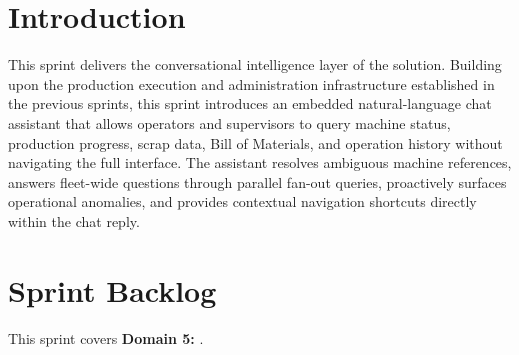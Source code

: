 \section*{Introduction}

This sprint delivers the conversational intelligence layer of the 
solution. Building upon the production execution and administration infrastructure
established in the previous sprints, this sprint introduces an embedded
natural-language chat assistant that allows operators and supervisors to query
machine status, production progress, scrap data, Bill of Materials, and operation
history without navigating the full interface. The assistant resolves ambiguous
machine references, answers fleet-wide questions through parallel fan-out queries,
proactively surfaces operational anomalies, and provides contextual navigation
shortcuts directly within the chat reply.
 
\section{Sprint Backlog}

This sprint covers \textbf{Domain 5:}
\textbf{}.

